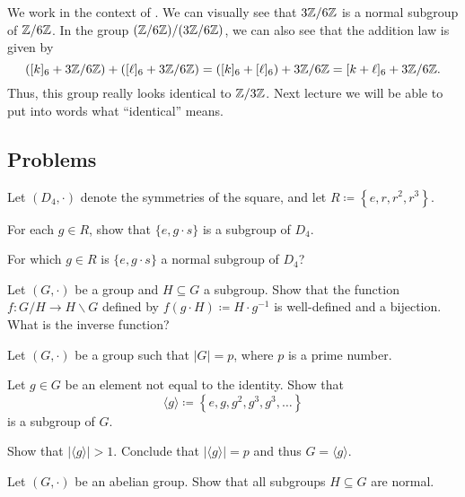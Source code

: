 \documentclass[../main.tex]{subfiles}
\begin{document}
\begin{example} \label{ex:double-quotient-is-z3z}
    We work in the context of . We can visually see that $3\mathbb Z/6\mathbb Z$ is a normal subgroup of $\mathbb Z/6\mathbb Z$. In the group $(\mathbb Z/6\mathbb Z)/(3\mathbb Z/6\mathbb Z)$, we can also see that the addition law is given by
    \[([k]_6+3\mathbb Z/6\mathbb Z)+([\ell]_6+3\mathbb Z/6\mathbb Z)=([k]_6+[\ell]_6)+3\mathbb Z/6\mathbb Z=[k+\ell]_6+3\mathbb Z/6\mathbb Z.\]
    Thus, this group really looks identical to $\mathbb Z/3\mathbb Z$. Next lecture we will be able to put into words what ``identical'' means.
\end{example}

\subsection{Problems}

\begin{homework}
    Let $(D_4,\cdot)$ denote the symmetries of the square, and let $R\coloneqq\left\{e,r,r^2,r^3\right\}$.
    \begin{listalph}
        \item For each $g\in R$, show that $\{e,g\cdot s\}$ is a subgroup of $D_4$.
        \item For which $g\in R$ is $\{e,g\cdot s\}$ a normal subgroup of $D_4$?
    \end{listalph}
\end{homework}

\begin{homework}
    Let $(G,\cdot)$ be a group and $H\subseteq G$ a subgroup. Show that the function $f\colon G/H\to H\backslash G$ defined by $f(g\cdot H)\coloneqq H\cdot g^{-1}$ is well-defined and a bijection. What is the inverse function?
\end{homework}

\begin{homework}
    Let $(G,\cdot)$ be a group such that $|G|=p$, where $p$ is a prime number.
    \begin{listalph}
        \item Let $g\in G$ be an element not equal to the identity. Show that
        \[\langle g\rangle\coloneqq\left\{e,g,g^2,g^3,g^3,\ldots\right\}\]
        is a subgroup of $G$.
        \item Show that $|\langle g\rangle|>1$. Conclude that $|\langle g\rangle|=p$ and thus $G=\langle g\rangle$.
    \end{listalph}
\end{homework}

\begin{homework}
    Let $(G,\cdot)$ be an abelian group. Show that all subgroups $H\subseteq G$ are normal.
\end{homework}
\end{document}
